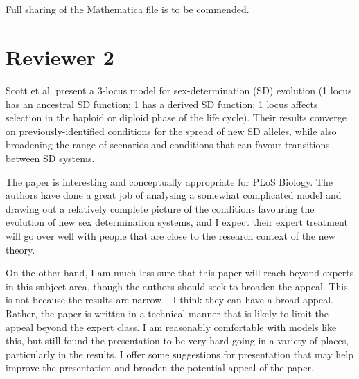 \documentclass[10pt,letterpaper]{article}
\begin{document}
\noindent\subsection{}
Full sharing of the Mathematica file is to be commended.

\section{Reviewer 2}

Scott et al. present a 3-locus model for sex-determination (SD) evolution (1 locus has an ancestral SD function; 1 has a derived SD function; 1 locus affects selection in the haploid or diploid phase of the life cycle). Their results converge on previously-identified conditions for the spread of new SD alleles, while also broadening the range of scenarios and conditions that can favour transitions between SD systems.

The paper is interesting and conceptually appropriate for PLoS Biology. The authors have done a great job of analysing a somewhat complicated model and drawing out a relatively complete picture of the conditions favouring the evolution of new sex determination systems, and I expect their expert treatment will go over well with people that are close to the research context of the new theory.

On the other hand, I am much less sure that this paper will reach beyond experts in this subject area, though the authors should seek to broaden the appeal. This is not because the results are narrow -- I think they can have a broad appeal. Rather, the paper is written in a technical manner that is likely to limit the appeal beyond the expert class. I am reasonably comfortable with models like this, but still found the presentation to be very hard going in a variety of places, particularly in the results. I offer some suggestions for presentation that may help improve the presentation and broaden the potential appeal of the paper.
\end{document}

